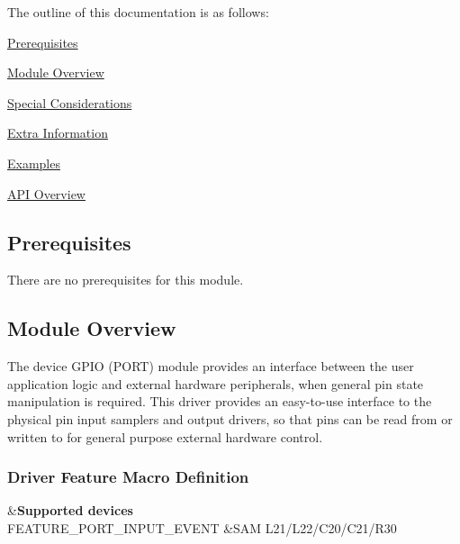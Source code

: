 The outline of this documentation is as follows\+:
\begin{DoxyItemize}
\item \hyperlink{group__asfdoc__sam0__port__group_asfdoc_sam0_port_prerequisites}{Prerequisites}
\item \hyperlink{group__asfdoc__sam0__port__group_asfdoc_sam0_port_module_overview}{Module Overview}
\item \hyperlink{group__asfdoc__sam0__port__group_asfdoc_sam0_port_special_considerations}{Special Considerations}
\item \hyperlink{group__asfdoc__sam0__port__group_asfdoc_sam0_port_extra_info}{Extra Information}
\item \hyperlink{group__asfdoc__sam0__port__group_asfdoc_sam0_port_examples}{Examples}
\item \hyperlink{group__asfdoc__sam0__port__group_asfdoc_sam0_port_api_overview}{A\+P\+I Overview}
\end{DoxyItemize}\hypertarget{group__asfdoc__sam0__port__group_asfdoc_sam0_port_prerequisites}{}\subsection{Prerequisites}\label{group__asfdoc__sam0__port__group_asfdoc_sam0_port_prerequisites}
There are no prerequisites for this module.\hypertarget{group__asfdoc__sam0__port__group_asfdoc_sam0_port_module_overview}{}\subsection{Module Overview}\label{group__asfdoc__sam0__port__group_asfdoc_sam0_port_module_overview}
The device G\+P\+I\+O (P\+O\+R\+T) module provides an interface between the user application logic and external hardware peripherals, when general pin state manipulation is required. This driver provides an easy-\/to-\/use interface to the physical pin input samplers and output drivers, so that pins can be read from or written to for general purpose external hardware control.\hypertarget{group__asfdoc__sam0__port__group_asfdoc_sam0_port_features}{}\subsubsection{Driver Feature Macro Definition}\label{group__asfdoc__sam0__port__group_asfdoc_sam0_port_features}
\begin{TabularC}{2}
\hline
{}&{\bf Supported devices  }\\
F\+E\+A\+T\+U\+R\+E\+\_\+\+P\+O\+R\+T\+\_\+\+I\+N\+P\+U\+T\+\_\+\+E\+V\+E\+N\+T &S\+A\+M L21/\+L22/\+C20/\+C21/\+R30  \\
\end{TabularC}
